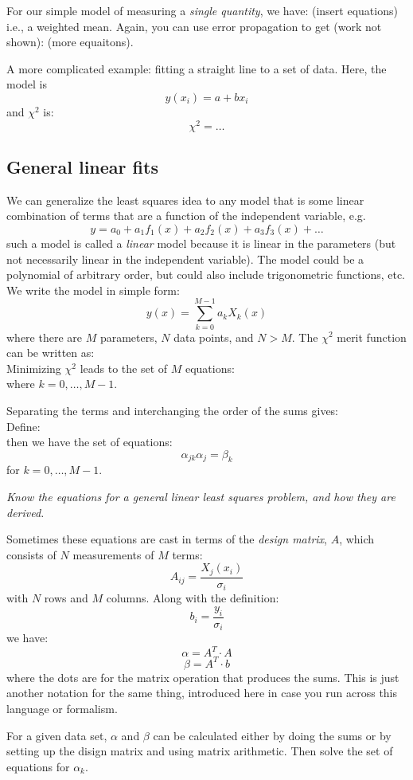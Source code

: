 \documentclass[12pt]{article}
\begin{document}
For our simple model of measuring a \emph{single quantity}, we have:
(insert equations) i.e., a weighted mean. Again, you can use error
propagation to get (work not shown): (more equaitons).

A more complicated example: fitting a straight line to a set of data.
Here, the model is
$$ y(x_i) = a + bx_i $$
and $\chi^2$ is:
$$ \chi^2 = \ldots$$




\subsection{General linear fits}
We can generalize the least squares idea to any model that is some linear
combination of terms that are a function of the independent variable,
e.g.
$$ y = a_0 + a_1f_1(x) + a_2f_2(x) + a_3f_3(x) + \ldots $$
such a model is called a \emph{linear} model because it is linear
in the parameters (but not necessarily linear in the independent
variable). The model could be a polynomial of arbitrary order, but
could also include trigonometric functions, etc. We write the model
in simple form:
$$ y(x) = \sum_{k=0}^{M-1}a_kX_k(x) $$
where there are $M$ parameters, $N$ data points, and $N>M$.
The $\chi^2$ merit function can be written as:
$$ $$
Minimizing $\chi^2$ leads to the set of $M$ equations:
$$ $$
where $k=0,\ldots,M-1$.

Separating the terms and interchanging the order of the sums gives:
$$ $$
Define:
$$ $$
$$ $$
then we have the set of equations:
$$ \alpha_{jk}\alpha_{j} = \beta_{k} $$
for $k=0,\ldots,M-1$.

\colorbox{hl}{\parbox{0.9\textwidth}
{\emph{Know the equations for a general linear least squares
problem, and how they are derived.}}}

Sometimes these equations are cast in terms of the \emph{design matrix},
$A$, which consists of $N$ measurements of $M$ terms:
$$ A_{ij} = \frac{X_j(x_i)}{\sigma_i}  $$
with $N$ rows and $M$ columns. Along with the definition:
$$ b_i = \frac{y_i}{\sigma_i} $$
we have:
$$ \alpha = A^T \cdot A $$
$$ \beta = A^T \cdot b $$
where the dots are for the matrix operation that produces the sums.
This is just another notation for the same thing, introduced here in
case you run across this language or formalism.

For a given data set, $\alpha$ and $\beta$ can be calculated either
by doing the sums or by setting up the disign matrix and using matrix
arithmetic. Then solve the set of equations for $\alpha_k$.
\end{document}
